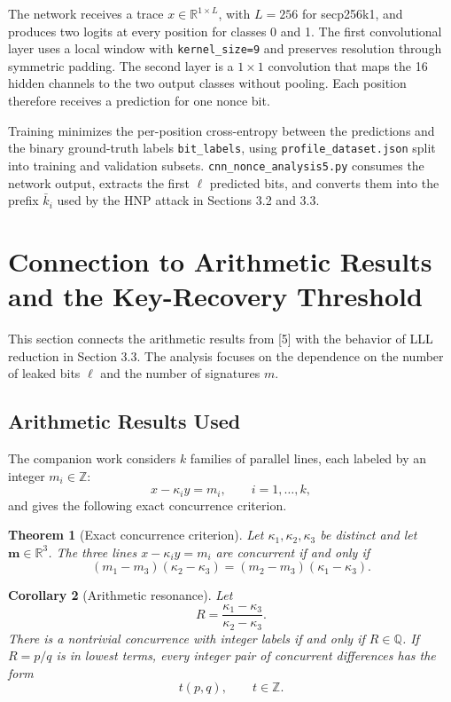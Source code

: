 \documentclass[11pt,a4paper]{article}
\newtheorem{theorem}{Theorem}[section]
\newtheorem{corollary}[theorem]{Corollary}
\begin{document}
The network receives a trace $x\in\mathbb R^{1\times L}$, with $L=256$ for secp256k1, and produces two logits at every position for classes 0 and 1. The first convolutional layer uses a local window with \texttt{kernel\_size=9} and preserves resolution through symmetric padding. The second layer is a $1\times1$ convolution that maps the 16 hidden channels to the two output classes without pooling. Each position therefore receives a prediction for one nonce bit.

Training minimizes the per-position cross-entropy between the predictions and the binary ground-truth labels \texttt{bit\_labels}, using \texttt{profile\_dataset.json} split into training and validation subsets. \texttt{cnn\_nonce\_analysis5.py} consumes the network output, extracts the first $\ell$ predicted bits, and converts them into the prefix $\bar{k}_i$ used by the HNP attack in Sections 3.2 and 3.3.

\section{Connection to Arithmetic Results and the Key-Recovery Threshold}

This section connects the arithmetic results from [5] with the behavior of LLL reduction in Section 3.3. The analysis focuses on the dependence on the number of leaked bits $\ell$ and the number of signatures $m$.

\subsection{Arithmetic Results Used}

The companion work considers $k$ families of parallel lines, each labeled by an integer $m_i\in\mathbb Z$:
\[
x-\kappa_i y=m_i,
\qquad i=1,\ldots,k,
\]
and gives the following exact concurrence criterion.

\begin{theorem}[Exact concurrence criterion]
Let $\kappa_1,\kappa_2,\kappa_3$ be distinct and let $\mathbf m\in\mathbb R^3$. The three lines $x-\kappa_i y=m_i$ are concurrent if and only if
\[
(m_1-m_3)(\kappa_2-\kappa_3)
=
(m_2-m_3)(\kappa_1-\kappa_3).
\]
\end{theorem}

\begin{corollary}[Arithmetic resonance]
Let
\[
R=\frac{\kappa_1-\kappa_3}{\kappa_2-\kappa_3}.
\]
There is a nontrivial concurrence with integer labels if and only if $R\in\mathbb Q$. If $R=p/q$ is in lowest terms, every integer pair of concurrent differences has the form
\[
t(p,q),\qquad t\in\mathbb Z.
\]
\end{corollary}
\end{document}
